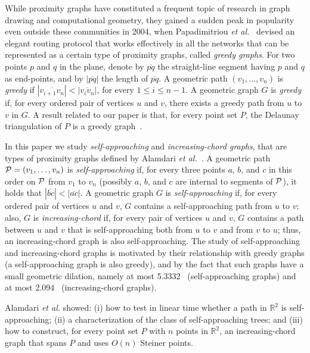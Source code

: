 \documentclass{llncs}
\begin{document}
While proximity graphs have constituted a frequent topic of research in graph drawing and computational geometry, they gained a sudden peak in popularity even outside these communities in 2004, when Papadimitriou {\em et al.}~\cite{conf/mobicom/RaoPSS03} devised an elegant routing protocol that works effectively in all the networks that can be represented as a certain type of proximity graphs, called {\em greedy graphs}. For two points $p$ and $q$ in the plane, denote by $\overline{pq}$ the straight-line segment having $p$ and $q$ as end-points, and by $|\overline{pq}|$ the length of $\overline{pq}$. A geometric path $(v_1,\dots,v_n)$ is {\em greedy} if $|\overline{v_{i+1}v_n}|<|\overline{v_{i}v_n}|$, for every $1\leq i\leq n-1$. A geometric graph $G$ is {\em greedy} if, for every ordered pair of vertices $u$ and $v$, there exists a greedy path from $u$ to $v$ in $G$. A result related to our paper is that, for every point set $P$, the Delaunay triangulation of $P$ is a greedy graph~\cite{PapadimitriouR05}.

In this paper we study {\em self-approaching} and {\em increasing-chord graphs}, that are types of proximity graphs defined by Alamdari {\em et al.}~\cite{acglp-sag-12}. A geometric path ${\cal P}=(v_1,\dots,v_n)$ is {\em self-approaching} if, for every three points $a$, $b$, and $c$ in this order on ${\cal P}$ from $v_1$ to $v_n$ (possibly $a$, $b$, and $c$ are internal to segments of ${\cal P}$), it holds that $|\overline{bc}|<|\overline{ac}|$. A geometric graph $G$ is {\em self-approaching} if, for every ordered pair of vertices $u$ and $v$, $G$ contains a self-approaching path from $u$ to $v$; also, $G$ is {\em increasing-chord} if, for every pair of vertices $u$ and $v$, $G$ contains a path between $u$ and $v$ that is self-approaching both from $u$ to $v$ and from $v$ to $u$; thus, an increasing-chord graph is also self-approaching. The study of self-approaching and increasing-chord graphs is motivated by their relationship with greedy graphs (a self-approaching graph is also greedy), and by the fact that such graphs have a small geometric dilation, namely at most 5.3332~\cite{ikl-sac-99} (self-approaching graphs) and at most 2.094~\cite{r-cic-94} (increasing-chord graphs).

Alamdari {\em et al.} showed: (i) how to test in linear time whether a path in $\mathbb R^2$ is self-approaching; (ii) a characterization of the class of self-approaching trees; and (iii) how to construct, for every point set $P$ with $n$ points in $\mathbb R^2$, an increasing-chord graph that spans $P$ and uses $O(n)$ Steiner points.
\end{document}
